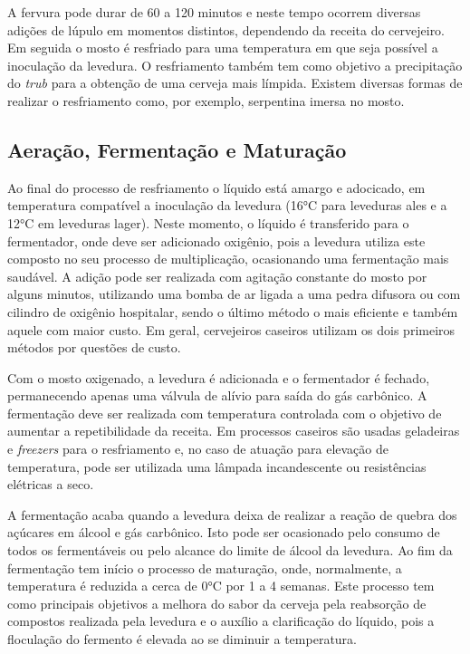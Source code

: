A fervura pode durar de 60 a 120 minutos e neste tempo ocorrem diversas adições de lúpulo em momentos distintos, dependendo da receita do cervejeiro. Em seguida o mosto é resfriado para uma temperatura em que seja possível a inoculação da levedura. O resfriamento também tem como objetivo a precipitação do \emph{trub} para a obtenção de uma cerveja mais límpida. Existem diversas formas de realizar o resfriamento como, por exemplo, serpentina imersa no mosto. 


				\subsection{Aeração, Fermentação e Maturação}
Ao final do processo de resfriamento o líquido está amargo e adocicado, em temperatura compatível a inoculação da levedura (16°C para leveduras ales e a 12°C em leveduras lager). Neste momento, o líquido é transferido para o fermentador, onde deve ser adicionado oxigênio, pois a levedura utiliza este composto no seu processo de multiplicação, ocasionando uma fermentação mais saudável. A adição pode ser realizada com agitação constante do mosto por alguns minutos, utilizando uma bomba de ar ligada a uma pedra difusora ou com cilindro de oxigênio hospitalar, sendo o último método o mais eficiente e também aquele com maior custo. Em geral, cervejeiros caseiros utilizam os dois primeiros métodos por questões de custo.

Com o mosto oxigenado, a levedura é adicionada e o fermentador é fechado, permanecendo apenas uma válvula de alívio para saída do gás carbônico. A fermentação deve ser realizada com temperatura controlada com o objetivo de aumentar a repetibilidade da receita. Em processos caseiros são usadas geladeiras e \emph{freezers} para o resfriamento e, no caso de atuação para elevação de temperatura, pode ser utilizada uma lâmpada incandescente ou resistências elétricas a seco. 

A fermentação acaba quando a levedura deixa de realizar a reação de quebra dos açúcares em álcool e gás carbônico. Isto pode ser ocasionado pelo consumo de todos os fermentáveis ou pelo alcance do limite de álcool da levedura. Ao fim da fermentação tem início o processo de maturação, onde, normalmente, a temperatura é reduzida a cerca de 0°C por 1 a 4 semanas. Este processo tem como principais objetivos a melhora do sabor da cerveja pela reabsorção de compostos realizada pela levedura e o auxílio a clarificação do líquido, pois a floculação do fermento é elevada ao se diminuir a temperatura.



